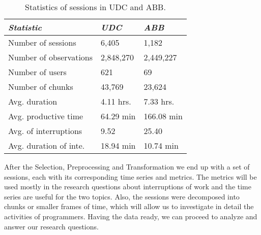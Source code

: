 \begin{table}[ht!]
	\small
	\caption{Statistics of sessions in UDC and ABB. }
	\label{tbl:stats_sessions}
	\centering
	\begin{tabular}{p{3.5cm}|p{2cm}|p{2cm}} 
		\hline
		\emph{Statistic} & \emph{UDC} & \emph{ABB} \\
		\hline
		\hline
		Number of sessions & 6,405 & 1,182 \\
		\hline
		Number of observations & 2,848,270 & 2,449,227 \\
		\hline
		Number of users & 621 & 69 \\
		\hline
		Number of chunks & 43,769 & 23,624 \\
		\hline
		Avg. duration & 4.11 hrs. & 7.33 hrs. \\
		\hline
		Avg. productive time & 64.29 min & 166.08 min \\
		\hline
		Avg. of interruptions & 9.52 & 25.40 \\
		\hline
		Avg. duration of inte. & 18.94 min & 10.74 min \\
		\hline
	\end{tabular}
\end{table}

After the Selection, Preprocessing and Transformation we end up with a set of sessions, each with its corresponding time series and metrics. The metrics will be used mostly in the research questions about interruptions of work and the time series are useful for the two topics. Also, the sessions were decomposed into chunks or smaller frames of time, which will allow us to investigate in detail the activities of programmers. Having the data ready, we can proceed to analyze and answer our research questions.

